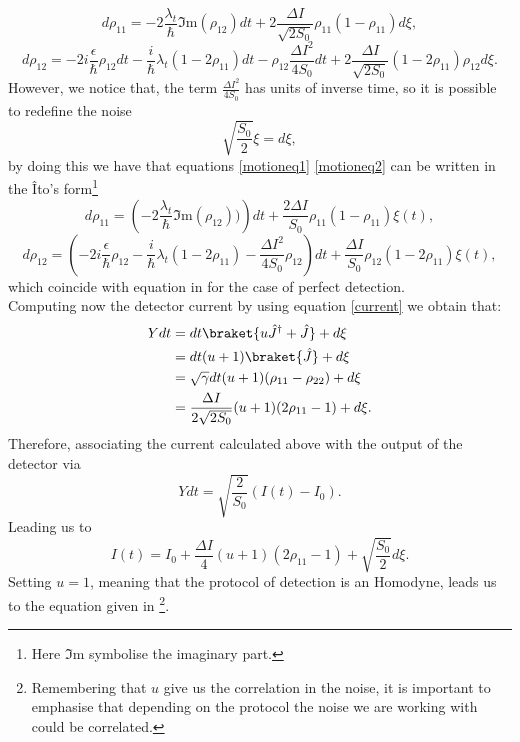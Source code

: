 \begin{equation}
d\rho_{11}=-2\frac{\lambda_t}{\hbar}\Im\text{m}(\rho_{12})dt+2\frac{\Delta I}{\sqrt{2S_{0}}}\rho_{11}(1-\rho_{11})d\xi,
\label{motioneq1}
\end{equation}
\begin{equation}
d\rho_{12}=-2i\frac{\epsilon}{\hbar}\rho_{12}dt-\frac{i}{\hbar}\lambda_t(1-2\rho_{11})dt -\rho_{12}\frac{\Delta I^{2}}{4S_{0}}dt+2\frac{\Delta I}{\sqrt{2S_{0}}}(1-2\rho_{11})\rho_{12}d\xi.
\label{motioneq2}
\end{equation}
However, we notice that, the term $\frac{\Delta I^{2}}{4S_{0}}$ has units of inverse time, so it is possible to redefine the noise
\[\sqrt{\frac{S_0}{2}}\xi=d\xi,\]
by doing this we have that equations \eqref{motioneq1} \eqref{motioneq2} can be written in the Îto's form\footnote{Here $\Im\text{m}$ symbolise the imaginary part.}
\begin{equation}
d\rho_{11}=\left(-2\frac{\lambda_t}{\hbar}\Im\text{m}(\rho_{12}))\right)dt+\frac{2\Delta I}{S_0}\rho_{11}(1-\rho_{11})\xi(t),
\label{rho11}
\end{equation}
\begin{equation}
d\rho_{12}=\left(-2i\frac{\epsilon}{\hbar}\rho_{12}-\frac{i}{\hbar}\lambda_t(1-2\rho_{11})-\frac{\Delta I^2}{4S_0}\rho_{12}\right)dt+\frac{\Delta I}{S_0}\rho_{12}(1-2\rho_{11})\xi(t),
\label{rho22}
\end{equation}
which coincide with equation in \cite{PhysRevB.63.115403,Alexander,2540650509c442d0b14e917fdf7a4ca7} for the case of perfect detection.\\
Computing now the detector current by using equation \eqref{current} we obtain that:
\begin{align*}
Y dt&=dt\braket{u\hat{J}^{\dagger}+\hat{J}}+d\xi\\
&=dt(u+1)\braket{\hat{J}}+d\xi\\
&=\sqrt{\gamma} dt (u+1)(\rho_{11}-\rho_{22})+d\xi\\
&=\frac{\Delta I}{2\sqrt{2S_0}}(u+1)(2\rho_{11}-1)+d\xi.
\end{align*}
Therefore, associating the current calculated above with the output of the detector via 
\[Ydt=\sqrt{\frac{2}{S_0}}(I(t)-I_0).\]
Leading us to
\[I(t)=I_0+\frac{\Delta I}{4}(u+1)(2\rho_{11}-1)+\sqrt{\frac{S_0}{2}}d\xi.\]
Setting $u=1$, meaning that the protocol of detection is an Homodyne\cite{WISEMAN200191}, leads us to the equation given in \cite{2540650509c442d0b14e917fdf7a4ca7}\footnote{Remembering that $u$ give us the correlation in the noise, it is important to emphasise that depending on the protocol the noise we are working with could be correlated.}.
